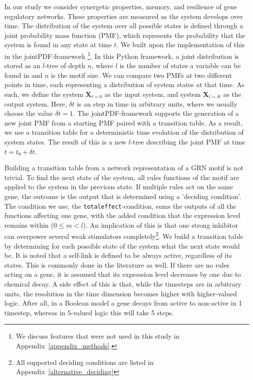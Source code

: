 \documentclass[../main.tex]{subfiles}
\begin{document}
In our study we consider synergetic properties, memory, and resilience of gene regulatory networks.
These properties are measured as the system develops over time.
The distribution of the system over all possible states is defined through a joint probability mass function (PMF), which represents the probability that the system is found in any state at time $t$.
We built upon the implementation of this in the jointPDF-framework \cite{jointpdf}\footnote{We discuss features that were not used in this study in Appendix~\ref{appendix_methods}.}.
In this Python framework, a joint distribution is stored as an $l$-tree of depth $n$, where $l$ is the number of states a variable can be found in and $n$ is the motif size.
We can compare two PMFs at two different points in time, each representing a distribution of system states at that time.
As such, we define the system $\mathbf{X}_{t=0}$ as the input system, and system $\mathbf{X}_{t=\delta t}$ as the output system.
Here, $\delta t$ is an step in time in arbitrary units, where we usually choose the value $\delta t = 1$. 
The jointPDF-framework supports the generation of a new joint PMF from a starting PMF paired with a transition table.
As a result, we use a transition table for a deterministic time evolution of the distribution of system states.
The result of this is a new $l$-tree describing the joint PMF at time $t=t_0+\delta t$.

Building a transition table from a network representation of a GRN motif is not trivial.
To find the next state of the system, all rules functions of the motif are applied to the system in the previous state.
If multiple rules act on the same gene, the outcome is the output that is determined using a 'deciding condition'.
The condition we use, the \texttt{totaleffect}-condition, sums the outputs of all the functions affecting one gene, with the added condition that the expression level remains within ($0 \le m < l$).
An implication of this is that one strong inhibitor can overpower several weak stimulators completely\footnote{All supported deciding conditions are listed in Appendix~\ref{alternative_deciding}}.
We build a transition table by determining for each possible state of the system what the next state would be.
It is noted that a self-link is defined to be always active, regardless of its states.
This is commonly done in the literature as well.
If there are no rules acting on a gene, it is assumed that its expression level decreases by one due to chemical decay.
A side effect of this is that, while the timesteps are in arbitrary units, the resolution in the time dimension becomes higher with higher-valued logic.
After all, in a Boolean model a gene decays from active to non-active in 1 timestep, whereas in 5-valued logic this will take 5 steps.
\end{document}
